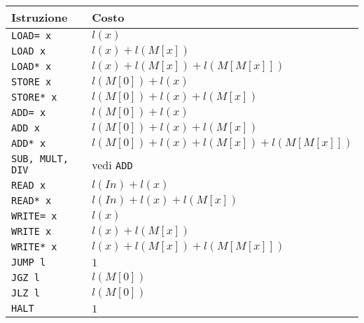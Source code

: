 \documentclass[a4paper,11pt,oneside]{article}
\theoremstyle{plain}
\theoremstyle{definition}
\theoremstyle{remark}
\begin{document}
\begin{table}[htb]
  \centering
  \begin{tabular}{ll}
    \toprule
    Istruzione & Costo \\
    \midrule
    \texttt{LOAD= x}  & $l(x)$ \\
    \texttt{LOAD x}   & $l(x) + l(M[x])$ \\
    \texttt{LOAD* x}  & $l(x) + l(M[x]) + l(M[M[x]])$ \\
    \texttt{STORE x}  & $l(M[0]) + l(x)$ \\
    \texttt{STORE* x} & $l(M[0]) + l(x) + l(M[x])$ \\
    \texttt{ADD= x}   & $l(M[0]) + l(x)$ \\
    \texttt{ADD x}    & $l(M[0]) + l(x) + l(M[x])$ \\
    \texttt{ADD* x}   & $l(M[0]) + l(x) + l(M[x]) + l(M[M[x]])$ \\
    \texttt{SUB, MULT, DIV} & vedi \texttt{ADD} \\
    \texttt{READ x}   & $l(In) + l(x)$ \\
    \texttt{READ* x}  & $l(In) + l(x) + l(M[x])$ \\
    \texttt{WRITE= x} & $l(x)$ \\
    \texttt{WRITE x}  & $l(x) + l(M[x])$ \\
    \texttt{WRITE* x} & $l(x) + l(M[x]) + l(M[M[x]])$ \\
    \texttt{JUMP l}   & $1$ \\
    \texttt{JGZ l}    & $l(M[0])$ \\
    \texttt{JLZ l}    & $l(M[0])$ \\
    \texttt{HALT}     & $1$ \\
    \bottomrule
  \end{tabular}
\end{table}
\end{document}
